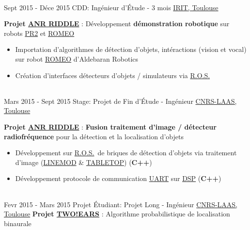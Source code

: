 \documentclass[letterpaper]{twentysecondcv} %
\newcommand{\ros}{\href{http://www.ros.org/}{R.O.S.}}
\begin{document}
\begin{twenty}
{\begin{itemize}
    \end{itemize}
  }
  \\
  \twentyitem
  {Sept 2015 -}
  {Déce 2015}
  {CDD: Ingénieur d'Étude - 3 mois}
  {\href{https://www.irit.fr/?lang=fr}{IRIT, Toulouse}}
  {
    \textbf{Projet
      \href{http://www.agence-nationale-recherche.fr/Project-ANR-12-CORD-0003}{ANR
        RIDDLE}} : Développement \textbf{démonstration robotique} sur robots
    \href{http://www.willowgarage.com/pages/pr2/overview}{PR2} et
    \href{https://spectrum.ieee.org/automaton/robotics/humanoids/aldebaran-robotics-introduces-romeo-finally}{ROMEO}
    \begin{itemize}
    \item Importation d'algorithmes de détection d'objets, intéractions (vision
      et vocal) sur robot
      \href{https://spectrum.ieee.org/automaton/robotics/humanoids/aldebaran-robotics-introduces-romeo-finally}{ROMEO}
      d'Aldebaran Robotics
    \item Création d'interfaces détecteurs d'objets / simulateurs via \ros
    \end{itemize}
  }
  \\
  \twentyitem
  {Mars 2015 -}
  {Sept 2015}
  {Stage: Projet de Fin d'Étude - Ingénieur}
  {\href{https://www.laas.fr/public/fr}{CNRS-LAAS, Toulouse}}
  {
    \textbf{Projet
      \href{http://www.agence-nationale-recherche.fr/Project-ANR-12-CORD-0003}{ANR
        RIDDLE}} : \textbf{Fusion traitement d'image / détecteur radiofréquence}
    pour la détection et la localisation d'objets
    \begin{itemize}
    \item Développement sur \ros\ de briques de détection d'objets via
      traitement
      d'image (\href{http://www.stefan-hinterstoisser.com/papers/hinterstoisser2011linemod.pdf}{LINEMOD} 
      \& \href{http://wiki.ros.org/tabletop_object_detector}{TABLETOP}) (\textbf{C++})
    \item Développement protocole de communication
      \href{https://en.wikipedia.org/wiki/Universal_asynchronous_receiver-transmitter}{UART} 
      sur \href{https://en.wikipedia.org/wiki/Digital_signal_processor}{DSP} (\textbf{C++})
    \end{itemize}
  }
  \\
  \twentyitem
  {Fevr 2015 -}
  {Mars 2015}
  {Projet Étudiant: Projet Long - Ingénieur}
  {\href{https://www.laas.fr/public/fr}{CNRS-LAAS, Toulouse}}
  {
    \textbf{Projet
      \href{http://twoears.eu/}{TWO!EARS}} : Algorithme probabilistique de
    localisation binaurale
}
\end{twenty}
\end{document}
